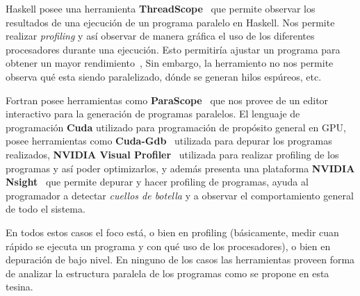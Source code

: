 Haskell posee una herramienta \textbf{ThreadScope}~\parencite{export:80976} que permite observar
los resultados de una ejecuci\'on de un programa paralelo en Haskell.
Nos permite realizar \textit{profiling} y as\'i observar de manera
gr\'afica el uso de los diferentes procesadores durante una ejecuci\'on.
Esto permitir\'ia ajustar un programa para obtener un mayor rendimiento~\parencite{export:79856},
Sin embargo, la herramiento no nos permite observa qu\'e esta siendo
paralelizado, d\'onde se generan hilos esp\'ureos, etc.

Fortran posee herramientas como \textbf{ParaScope}~\parencite{Kennedy:1991:IPP:628897.629046}
que nos provee de un editor interactivo para la generaci\'on de programas paralelos.
El lenguaje de programaci\'on \textbf{Cuda} utilizado para
programaci\'on de prop\'osito general en GPU, posee herramientas
como \textbf{Cuda-Gdb}~\parencite{CudaGdb} utilizada para depurar los programas realizados,
\textbf{NVIDIA Visual Profiler}~\parencite{CudaProf} utilizada para realizar profiling de
los programas y as\'i poder optimizarlos, y adem\'as presenta una plataforma
\textbf{NVIDIA Nsight}~\parencite{CudaNsight}  que permite depurar y hacer profiling de programas,
ayuda al programador a detectar \textit{cuellos de botella} y a observar
el comportamiento general de todo el sistema.

En todos estos casos el foco est\'a, o bien en profiling
(b\'asicamente, medir cuan
r\'apido se ejecuta un programa y con qu\'e uso de los procesadores),
o bien en depuraci\'on de bajo nivel. En ninguno de los casos las
herramientas proveen forma de analizar la estructura paralela de los
programas como se propone en esta tesina. 





